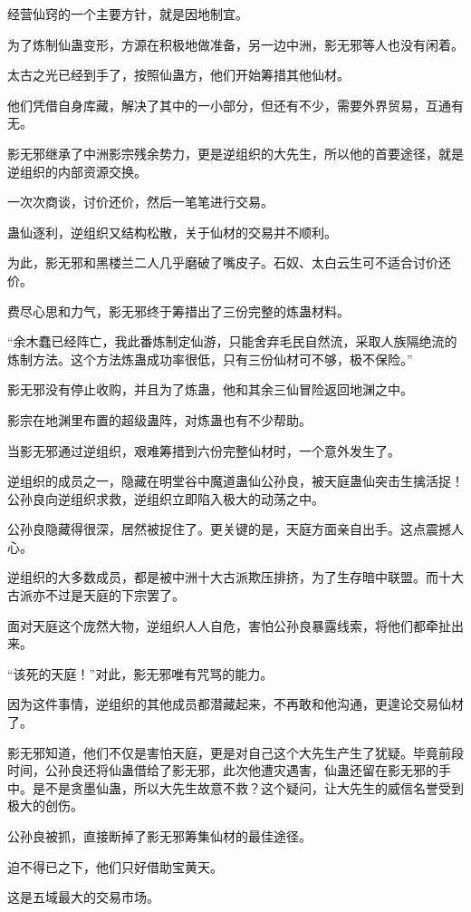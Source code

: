 \begin{this_body}
经营仙窍的一个主要方针，就是因地制宜。

为了炼制仙蛊变形，方源在积极地做准备，另一边中洲，影无邪等人也没有闲着。

太古之光已经到手了，按照仙蛊方，他们开始筹措其他仙材。

他们凭借自身库藏，解决了其中的一小部分，但还有不少，需要外界贸易，互通有无。

影无邪继承了中洲影宗残余势力，更是逆组织的大先生，所以他的首要途径，就是逆组织的内部资源交换。

一次次商谈，讨价还价，然后一笔笔进行交易。

蛊仙逐利，逆组织又结构松散，关于仙材的交易并不顺利。

为此，影无邪和黑楼兰二人几乎磨破了嘴皮子。石奴、太白云生可不适合讨价还价。

费尽心思和力气，影无邪终于筹措出了三份完整的炼蛊材料。

“余木蠢已经阵亡，我此番炼制定仙游，只能舍弃毛民自然流，采取人族隔绝流的炼制方法。这个方法炼蛊成功率很低，只有三份仙材可不够，极不保险。”

影无邪没有停止收购，并且为了炼蛊，他和其余三仙冒险返回地渊之中。

影宗在地渊里布置的超级蛊阵，对炼蛊也有不少帮助。

当影无邪通过逆组织，艰难筹措到六份完整仙材时，一个意外发生了。

逆组织的成员之一，隐藏在明堂谷中魔道蛊仙公孙良，被天庭蛊仙突击生擒活捉！公孙良向逆组织求救，逆组织立即陷入极大的动荡之中。

公孙良隐藏得很深，居然被捉住了。更关键的是，天庭方面亲自出手。这点震撼人心。

逆组织的大多数成员，都是被中洲十大古派欺压排挤，为了生存暗中联盟。而十大古派亦不过是天庭的下宗罢了。

面对天庭这个庞然大物，逆组织人人自危，害怕公孙良暴露线索，将他们都牵扯出来。

“该死的天庭！”对此，影无邪唯有咒骂的能力。

因为这件事情，逆组织的其他成员都潜藏起来，不再敢和他沟通，更遑论交易仙材了。

影无邪知道，他们不仅是害怕天庭，更是对自己这个大先生产生了犹疑。毕竟前段时间，公孙良还将仙蛊借给了影无邪，此次他遭灾遇害，仙蛊还留在影无邪的手中。是不是贪墨仙蛊，所以大先生故意不救？这个疑问，让大先生的威信名誉受到极大的创伤。

公孙良被抓，直接断掉了影无邪筹集仙材的最佳途径。

迫不得已之下，他们只好借助宝黄天。

这是五域最大的交易市场。


\end{this_body}
